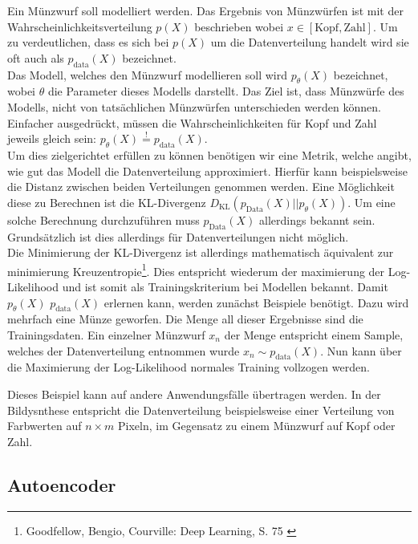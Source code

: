 Ein Münzwurf soll modelliert werden. Das Ergebnis von Münzwürfen ist mit der Wahrscheinlichkeitsverteilung $p(X)$ beschrieben wobei $x \in [\text{Kopf}, \text{Zahl}]$. Um zu verdeutlichen, dass es sich bei $p(X)$ um die Datenverteilung handelt wird sie oft auch als $p_\text{data}(X)$ bezeichnet. \\
Das Modell, welches den Münzwurf modellieren soll wird $p_\theta(X)$ bezeichnet, wobei $\theta$ die Parameter dieses Modells darstellt. Das Ziel ist, dass Münzwürfe des Modells, nicht von tatsächlichen Münzwürfen unterschieden werden können. Einfacher ausgedrückt, müssen die Wahrscheinlichkeiten für Kopf und Zahl jeweils gleich sein: $p_\theta(X) \overset{!}{=} p_\text{data}(X)$. \\ 
Um dies zielgerichtet erfüllen zu können benötigen wir eine Metrik, welche angibt, wie gut das Modell die Datenverteilung approximiert. Hierfür kann beispielsweise die Distanz zwischen beiden Verteilungen genommen werden. Eine Möglichkeit diese zu Berechnen ist die KL-Divergenz $D_\text{KL}(p_\text{Data}(X)||p_\theta(X))$. Um eine solche Berechnung durchzuführen muss $p_\text{Data}(X)$ allerdings bekannt sein. Grundsätzlich ist dies allerdings für Datenverteilungen nicht möglich. \\
Die Minimierung der KL-Divergenz ist allerdings mathematisch äquivalent zur minimierung Kreuzentropie\footnote{
    Goodfellow, Bengio, Courville: Deep Learning, S. 75
    \cite{Goodfellow-et-al-2016}
}. 
Dies entspricht wiederum der maximierung der Log-Likelihood und ist somit als Trainingskriterium bei Modellen bekannt.
Damit $p_\theta(X)$ $p_\text{data}(X)$ erlernen kann, werden zunächst Beispiele benötigt. Dazu wird mehrfach eine Münze geworfen. Die Menge all dieser Ergebnisse sind die Trainingsdaten. Ein einzelner Münzwurf $x_n$ der Menge entspricht einem Sample, welches der Datenverteilung entnommen wurde $x_n \sim p_\text{data}(X)$. Nun kann über die Maximierung der Log-Likelihood normales Training vollzogen werden.

Dieses Beispiel kann auf andere Anwendungsfälle übertragen werden. In der Bildysnthese entspricht die Datenverteilung beispielsweise einer Verteilung von Farbwerten auf $n \times m$ Pixeln, im Gegensatz zu einem Münzwurf auf Kopf oder Zahl.

\subsection{Autoencoder}

